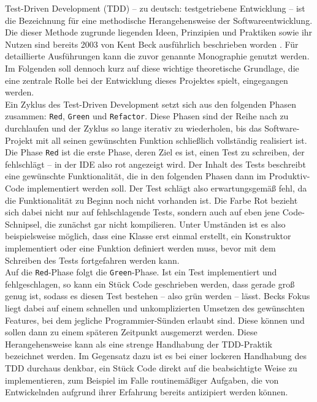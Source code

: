 
Test-Driven Development (TDD) -- zu deutsch: testgetriebene Entwicklung -- ist die 
Bezeichnung für eine methodische Herangehensweise der Softwareentwicklung. Die dieser 
Methode zugrunde liegenden Ideen, Prinzipien und Praktiken sowie ihr Nutzen sind bereits 
2003 von Kent Beck ausführlich beschrieben worden \cite{beck2003tdd}. Für detaillierte 
Ausführungen kann die zuvor genannte Monographie genutzt werden. Im Folgenden soll 
dennoch kurz auf diese wichtige theoretische Grundlage, die eine zentrale Rolle bei der 
Entwicklung dieses Projektes spielt, eingegangen werden. \\ 
Ein Zyklus des Test-Driven Development setzt sich aus den folgenden Phasen zusammen: 
\texttt{Red}, \texttt{Green} und \texttt{Refactor}. Diese Phasen sind der Reihe nach zu 
durchlaufen und der Zyklus so lange iterativ zu wiederholen, bis das Software-Projekt 
mit all seinen gewünschten Funktion schließlich vollständig realisiert ist. \\ 
Die Phase \texttt{Red} ist die erste Phase, deren Ziel es ist, einen Test zu schreiben, 
der fehlschlägt -- in der IDE also rot angezeigt wird. Der Inhalt des Tests beschreibt 
eine gewünschte Funktionalität, die in den folgenden Phasen dann im Produktiv-Code 
implementiert werden soll. Der Test schlägt also erwartungsgemäß fehl, da die 
Funktionalität zu Beginn noch nicht vorhanden ist. Die Farbe Rot bezieht sich dabei 
nicht nur auf fehlschlagende Tests, sondern auch auf eben jene Code-Schnipsel, die 
zunächst gar nicht kompilieren. Unter Umständen ist es also beispielsweise möglich, dass 
eine Klasse erst einmal erstellt, ein Konstruktor implementiert oder eine Funktion 
definiert werden muss, bevor mit dem Schreiben des Tests fortgefahren werden kann. \\ 
Auf die \texttt{Red}-Phase folgt die \texttt{Green}-Phase. Ist ein Test implementiert 
und fehlgeschlagen, so kann ein Stück Code geschrieben werden, dass gerade groß genug 
ist, sodass es diesen Test bestehen -- also grün werden -- lässt. Becks Fokus liegt 
dabei auf einem schnellen und unkomplizierten Umsetzen des gewünschten Features, bei dem 
jegliche Programmier-Sünden erlaubt sind. Diese können und sollen dann zu einem späteren 
Zeitpunkt ausgemerzt werden. Diese Herangehensweise kann als eine strenge 
Handhabung der TDD-Praktik bezeichnet werden. Im Gegensatz dazu ist es bei einer 
lockeren Handhabung des TDD durchaus denkbar, ein Stück Code direkt auf die 
beabsichtigte Weise zu implementieren, zum Beispiel im Falle routinemäßiger Aufgaben, 
die von Entwickelnden aufgrund ihrer Erfahrung bereits antizipiert werden können. \\ 

